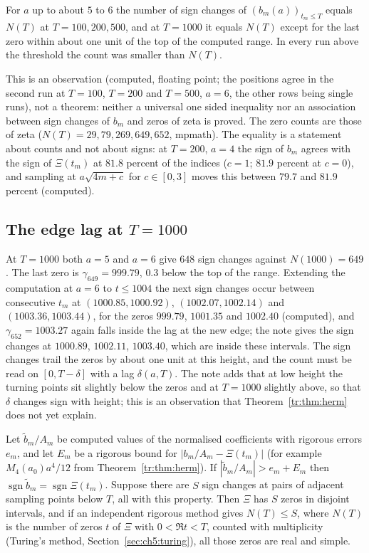 \begin{remark}[Observation]\label{tr:obs:count}
For $a$ up to about $5$ to $6$ the number of sign changes of $(b_m(a))_{t_m\le T}$ equals $N(T)$ at $T=100,200,500$, and at $T=1000$ it equals $N(T)$ except for the last zero within about one unit of the top of the computed range. In every run above the threshold the count was smaller than $N(T)$.
\end{remark}

This is an observation (computed, floating point; the positions agree in the second run at $T=100$, $T=200$ and $T=500$, $a=6$, the other rows being single runs), not a theorem: neither a universal one sided inequality nor an association between sign changes of $b_m$ and zeros of zeta is proved. The zero counts are those of zeta ($N(T)=29,79,269,649,652$, mpmath). The equality is a statement about counts and not about signs: at $T=200$, $a=4$ the sign of $b_m$ agrees with the sign of $\Xi(t_m)$ at $81.8$ percent of the indices ($c=1$; $81.9$ percent at $c=0$), and sampling at $a\sqrt{4m+c}$ for $c\in[0,3]$ moves this between $79.7$ and $81.9$ percent (computed).

\subsection{The edge lag at $T=1000$}

At $T=1000$ both $a=5$ and $a=6$ give $648$ sign changes against $N(1000)=649$. The last zero is $\gamma_{649}=999.79$, $0.3$ below the top of the range. Extending the computation at $a=6$ to $t\le1004$ the next sign changes occur between consecutive $t_m$ at $(1000.85,1000.92)$, $(1002.07,1002.14)$ and $(1003.36,1003.44)$, for the zeros $999.79$, $1001.35$ and $1002.40$ (computed), and $\gamma_{652}=1003.27$ again falls inside the lag at the new edge; the note gives the sign changes at $1000.89$, $1002.11$, $1003.40$, which are inside these intervals. The sign changes trail the zeros by about one unit at this height, and the count must be read on $[0,T-\delta]$ with a lag $\delta(a,T)$. The note adds that at low height the turning points sit slightly below the zeros and at $T=1000$ slightly above, so that $\delta$ changes sign with height; this is an observation that Theorem~\ref{tr:thm:herm} does not yet explain.

\begin{proposition}\label{tr:prop:verified}
Let $\widetilde b_m/A_m$ be computed values of the normalised coefficients with rigorous errors $e_m$, and let $E_m$ be a rigorous bound for $|b_m/A_m-\Xi(t_m)|$ (for example $M_4(a_0)a^4/12$ from Theorem~\ref{tr:thm:herm}). If $|\widetilde b_m/A_m|>e_m+E_m$ then $\operatorname{sgn}\widetilde b_m=\operatorname{sgn}\Xi(t_m)$. Suppose there are $S$ sign changes at pairs of adjacent sampling points below $T$, all with this property. Then $\Xi$ has $S$ zeros in disjoint intervals, and if an independent rigorous method gives $N(T)\le S$, where $N(T)$ is the number of zeros $t$ of $\Xi$ with $0<\Re t<T$, counted with multiplicity (Turing's method, Section~\ref{sec:ch5:turing}), all those zeros are real and simple.
\end{proposition}

